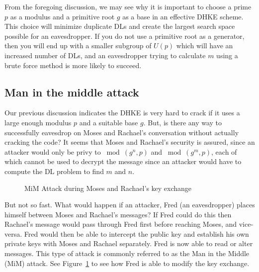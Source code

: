 From the foregoing discussion, we may see why it is important to choose a prime $p$ as a modulus and a primitive root $g$ as a base in an effective DHKE scheme. This choice will minimize duplicate DLs and create the largest search space possible for an eavesdropper.  If you do not use a primitive root as a generator, then you will end up with a smaller subgroup of $U(p)$ which will have an increased number of DLs, and an eavesdropper trying to calculate $m$ using a brute force method is more likely to succeed. 

\subsection{Man in the middle attack}
\label{subsec:FurtherCryptography:DiffieHellmanKeyExchange:MiddleAttack}

Our previous discussion indicates the DHKE is very hard to crack if it uses a large enough modulus $p$ and a suitable base $g$. But, is there any way to successfully eavesdrop on Moses and Rachael's conversation without actually cracking the code?  It seems that Moses and Rachael's security is assured, since an attacker would only be privy to $\bmod (g^n , p)$ and $\bmod (g^m , p)$, each of which cannot be used to decrypt the message since an attacker would have to compute the DL problem to find $m$ and $n$. 

\begin{figure}[htbp]
	  \caption{\label{fig:DH:DHKE_2} MiM Attack during Moses and Rachael's key exchange }
\end{figure}

But not so fast. What would happen if an attacker, Fred (an eavesdropper) places himself between Moses and Rachael's messages?  If Fred could do this then Rachael's message would pass through Fred first before reaching Moses, and vice-versa.  Fred would then be able to intercept the public key and establish his own private keys with Moses and Rachael separately.  Fred is now able to read or alter messages.  This type of attack is commonly referred to as the Man in the Middle (MiM) attack.  See Figure~\ref{fig:DH:DHKE_2} to see how Fred is able to modify the key exchange.


